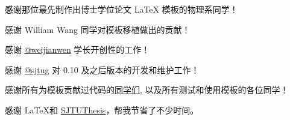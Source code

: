 
\begin{acknowledgements}
  感谢那位最先制作出博士学位论文 \LaTeX{} 模板的物理系同学！

  感谢 William Wang 同学对模板移植做出的贡献！

  感谢 \href{https://github.com/weijianwen}{@weijianwen} 学长开创性的工作！

  感谢 \href{https://github.com/sjtug}{@sjtug} 对 0.10 及之后版本的开发和维护工作！

  感谢所有为模板贡献过代码的\href{https://github.com/sjtug/SJTUThesis/graphs/contributors}{同学们}, 以及所有测试和使用模板的各位同学！

  感谢 \LaTeX 和 \href{https://github.com/sjtug/SJTUThesis}{SJTUThesis}，帮我节省了不少时间。
\end{acknowledgements}
